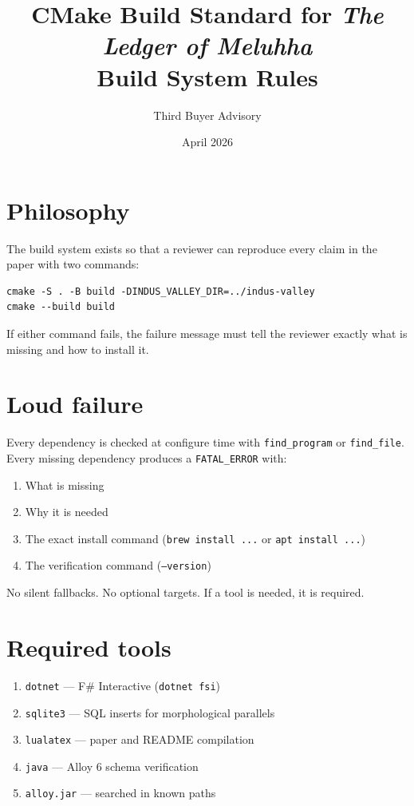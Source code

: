 \documentclass[11pt]{article}
\title{\textbf{CMake Build Standard for \textit{The Ledger of Meluhha}}\\
  \large Build System Rules}
\author{Third Buyer Advisory}
\date{April 2026}
\begin{document}
\maketitle

\section{Philosophy}

The build system exists so that a reviewer can reproduce every
claim in the paper with two commands:

\begin{Verbatim}[fontsize=\small,frame=single]
cmake -S . -B build -DINDUS_VALLEY_DIR=../indus-valley
cmake --build build
\end{Verbatim}

If either command fails, the failure message must tell the
reviewer exactly what is missing and how to install it.

\section{Loud failure}

Every dependency is checked at configure time with
\texttt{find\_program} or \texttt{find\_file}.
Every missing dependency produces a \texttt{FATAL\_ERROR}
with:

\begin{enumerate}[nosep]
\item What is missing
\item Why it is needed
\item The exact install command (\texttt{brew install ...}
  or \texttt{apt install ...})
\item The verification command (\texttt{--version})
\end{enumerate}

No silent fallbacks. No optional targets. If a tool is
needed, it is required.

\section{Required tools}

\begin{enumerate}[nosep]
\item \texttt{dotnet} --- F\# Interactive (\texttt{dotnet fsi})
\item \texttt{sqlite3} --- SQL inserts for morphological parallels
\item \texttt{lualatex} --- paper and README compilation
\item \texttt{java} --- Alloy 6 schema verification
\item \texttt{alloy.jar} --- searched in known paths
\end{enumerate}
\end{document}
